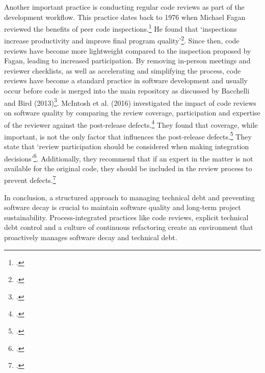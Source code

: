 Another important practice is conducting regular code reviews as part of the development workflow. This practice dates back to 1976 when Michael Fagan reviewed the benefits of peer code inspections.\footcite[183]{faganDesignCodeInspections1976}
He found that `inspections increase productivity and improve final program quality'\footcite[205]{faganDesignCodeInspections1976}.
Since then, code reviews have become more lightweight compared to the inspection proposed by Fagan, leading to increased participation. By removing in-person meetings and reviewer checklists, as well as accelerating and simplifying the process, code reviews have become a standard practice in software development and usually occur before code is merged into the main repository as discussed by Bacchelli and Bird (2013)\footcite[2]{bacchelliExpectationsOutcomesChallenges2013}.
McIntosh et al. (2016) investigated the impact of code reviews on software quality by comparing the review coverage, participation and expertise of the reviewer against the post-release defects.\footcite[6]{mcintoshEmpiricalStudyImpact2016}
They found that coverage, while important, is not the only factor that influences the post-release defects.\footcite[39]{mcintoshEmpiricalStudyImpact2016}
They state that `review participation should be considered when making integration decisions'\footcite[39]{mcintoshEmpiricalStudyImpact2016}.
Additionally, they recommend that if an expert in the matter is not available for the original code, they should be included in the review process to prevent defects.\footcite[39]{mcintoshEmpiricalStudyImpact2016}

In conclusion, a structured approach to managing technical debt and preventing software decay is crucial to maintain software quality and long-term project sustainability.
Process-integrated practices like code reviews, explicit technical debt control and a culture of continuous refactoring create an environment that proactively manages software decay and technical debt.

